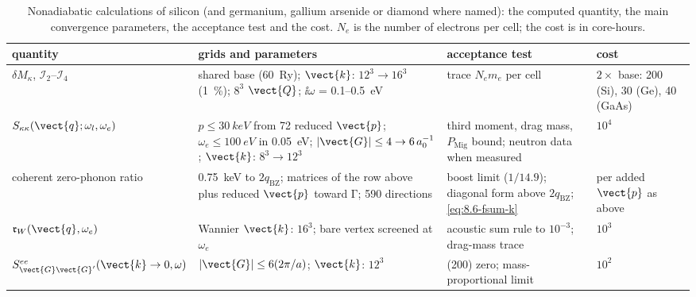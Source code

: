 \begin{table}[t]
  \centering
  \caption{Nonadiabatic calculations of silicon (and germanium, gallium arsenide or diamond where named): the computed quantity, the main convergence parameters, the acceptance test and the cost. $N_e$ is the number of electrons per cell; the cost is in core-hours.}
  \label{tab:E18-params}
  \small
  \setlength{\tabcolsep}{4pt}
  \begin{tabular}{p{}p{}p{}p{}}
    \toprule
    quantity & grids and parameters & acceptance test & cost \\
    \midrule
    $\delta M_\kappa$, $\mathcal{I}_2$--$\mathcal{I}_4$ & shared base (\SI{60}{Ry}); $\vect{k}$: $12^3\to16^3$ (\SI{1}{\percent}); $8^3$ $\vect{Q}$; $\ii\omega$ = 0.1--\SI{0.5}{eV} & trace $N_e m_e$ per cell & $2\times$ base: 200 (Si), 30 (Ge), 40 (GaAs) \\
    $S_{\kappa\kappa}(\vect{q};\omega_l,\omega_e)$ & $p \le \SI{30}{keV}$ from 72 reduced $\vect{p}$; $\omega_e \le \SI{100}{eV}$ in \SI{0.05}{eV}; $|\vect{G}| \le 4\to6\,a_0^{-1}$; $\vect{k}$: $8^3\to12^3$ & third moment, drag mass, $P_{\mathrm{Mig}}$ bound; neutron data when measured & $10^4$ \\
    coherent zero-phonon ratio & \SI{0.75}{keV} to $2q_{\mathrm{BZ}}$; matrices of the row above plus reduced $\vect{p}$ toward $\mathrm{\Gamma}$; 590 directions & boost limit ($1/14.9$); diagonal form above $2q_{\mathrm{BZ}}$; \cref{eq:8.6-fsum-k} & per added $\vect{p}$ as above \\
    $\mathfrak{r}_W(\vect{q},\omega_e)$ & Wannier $\vect{k}$: $16^3$; bare vertex screened at $\omega_e$ & acoustic sum rule to $10^{-3}$; drag-mass trace & $10^3$ \\
    $S^{ee}_{\vect{G}\vect{G}'}(\vect{k}\to0,\omega)$ & $|\vect{G}| \le 6(2\pi/a)$; $\vect{k}$: $12^3$ & (200) zero; mass-proportional limit & $10^2$ \\
    \bottomrule
  \end{tabular}
\end{table}
